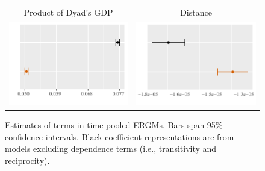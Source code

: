\documentclass[reqno,onecolumn,letterpaper,12pt]{article}
\begin{document}
\begin{figure}[!p]
\begin{tabular}{c@{\hskip 0cm}c}
Product of Dyad's GDP & Distance\\
\includegraphics[height=.2\textheight, clip=true, trim=0cm 0cm 0cm .2cm]{draft_figures/plots_pooled/DyadGDPProduct.pdf} &
\includegraphics[height=.2\textheight, clip=true, trim=0cm 0cm 0cm .2cm]{draft_figures/plots_pooled/Distance.pdf}   \\
\end{tabular}
\caption{\label{fig:effectPlots4} Estimates of terms in time-pooled ERGMs. Bars span 95\% confidence intervals. Black coefficient representations are from models excluding dependence terms (i.e., transitivity and reciprocity).}
\end{figure}
\end{document}

